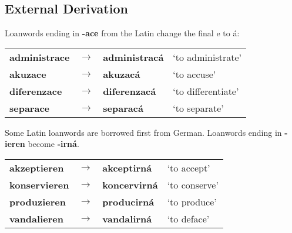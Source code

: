 \subsection{External Derivation}
\par Loanwords ending in \textbf{-ace} from the Latin change the final e to á:
\begin{table}[h!]
	\centering \small
	\begin{tabu} to 0.9
		administrace 	& $\rightarrow$ & administracá 	& `to administrate' \\
		akuzace			& $\rightarrow$ & akuzacá		& `to accuse'\\
		diferenzace		& $\rightarrow$ & diferenzacá	& `to differentiate'\\
		separace		& $\rightarrow$ & separacá		& `to separate'\\
	\end{tabu}
\end{table}
\par Some Latin loanwords are borrowed first from German. Loanwords ending in \textbf{-ieren} become \textbf{-irná}.
\begin{table}[h!]
	\centering \small
	\begin{tabu} to 0.9
		akzeptieren 	& $\rightarrow$ & akceptirná 	& `to accept' \\
		konservieren	& $\rightarrow$ & koncervirná	& `to conserve'\\
		produzieren		& $\rightarrow$ & producirná	& `to produce'\\
		vandalieren		& $\rightarrow$ & vandalirná 	& `to deface'\\
	\end{tabu}
\end{table}
